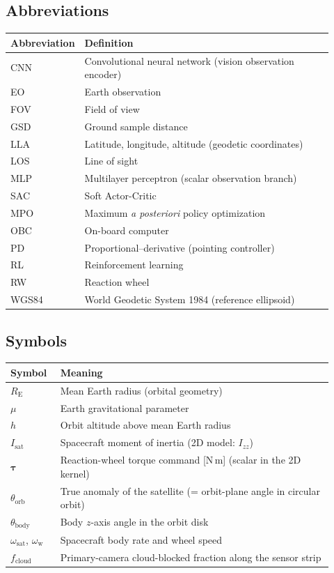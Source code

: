 
\subsection{Abbreviations}
\begin{tabular}{p{0.12\linewidth}p{0.80\linewidth}}
  \toprule
  Abbreviation & Definition \\
  \midrule
  CNN & Convolutional neural network (vision observation encoder) \\
  EO & Earth observation \\
  FOV & Field of view \\
  GSD & Ground sample distance \\
  LLA & Latitude, longitude, altitude (geodetic coordinates) \\
  LOS & Line of sight \\
  MLP & Multilayer perceptron (scalar observation branch) \\
  SAC & Soft Actor-Critic \\
  MPO & Maximum \emph{a posteriori} policy optimization \\
  OBC & On-board computer \\
  PD & Proportional--derivative (pointing controller) \\
  RL & Reinforcement learning \\
  RW & Reaction wheel \\
  WGS84 & World Geodetic System 1984 (reference ellipsoid) \\
  \bottomrule
\end{tabular}

\subsection{Symbols}
\begin{tabular}{p{0.14\linewidth}p{0.78\linewidth}}
  \toprule
  Symbol & Meaning \\
  \midrule
  $R_{\mathrm{E}}$ & Mean Earth radius (orbital geometry) \\
  $\mu$ & Earth gravitational parameter \\
  $h$ & Orbit altitude above mean Earth radius \\
  $I_{\mathrm{sat}}$ & Spacecraft moment of inertia (2D model: $I_{zz}$) \\
  $\boldsymbol{\tau}$ & Reaction-wheel torque command [N\,m] (scalar in the 2D kernel) \\
  $\theta_{\mathrm{orb}}$ & True anomaly of the satellite (= orbit-plane angle in circular orbit) \\
  $\theta_{\mathrm{body}}$ & Body $z$-axis angle in the orbit disk \\
  $\omega_{\mathrm{sat}}$, $\omega_{\mathrm{w}}$ & Spacecraft body rate and wheel speed \\
  $f_{\mathrm{cloud}}$ & Primary-camera cloud-blocked fraction along the sensor strip \\
  \bottomrule
\end{tabular}

